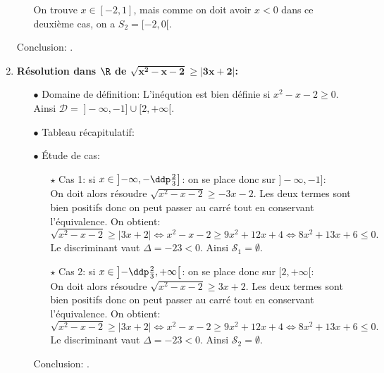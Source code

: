 \begin{correction}
\begin{enumerate}
\begin{itemize}
On trouve $x \in [-2,1]$, mais comme on doit avoir $x<0$ dans ce deuxi\`eme cas, on a $S_2=[-2,0[$.
\end{itemize}
Conclusion: .
\item \textbf{R\'esolution dans $\mathbf{\R}$ de $\mathbf{\sqrt{x^2-x-2}\geq |3x+2|}$:}\\
\begin{itemize}
\item[$\bullet$] Domaine de d\'efinition: L'in\'eqution est bien d\'efinie si $x^2-x-2\geq 0$. Ainsi $\mathcal{D}= \;\rbrack -\infty,-1\rbrack\cup\lbrack 2,+\infty\lbrack$.
\item[$\bullet$] Tableau r\'ecapitulatif:
\begin{center}
\end{center}
\item[$\bullet$] \'Etude de cas:
\begin{itemize}
\item[$\star$] Cas 1: si $x\in\left\rbrack -\infty,-\ddp\frac{2}{3}\right\rbrack$: on se place donc sur $\rbrack -\infty,-1\rbrack$:\\
\noindent On doit alors r\'esoudre $\sqrt{x^2-x-2}\geq -3x-2$. Les deux termes sont bien positifs donc on peut passer au carr\'e tout en conservant l'\'equivalence. On obtient:
$$\sqrt{x^2-x-2}\geq |3x+2| \Leftrightarrow x^2-x-2\geq 9x^2+12x+4 \Leftrightarrow 8x^2+13x+6\leq 0.$$
Le discriminant vaut $\Delta=-23<0$.
Ainsi $\mathcal{S}_1=\emptyset$.
\item[$\star$] Cas 2: si $x\in\left\rbrack -\ddp\frac{2}{3},+\infty\right\lbrack$: on se place donc sur $\lbrack 2,+\infty\lbrack$:\\
\noindent On doit alors r\'esoudre $\sqrt{x^2-x-2}\geq 3x+2$. Les deux termes sont bien positifs donc on peut passer au carr\'e tout en conservant l'\'equivalence. On obtient:
$$\sqrt{x^2-x-2}\geq |3x+2| \Leftrightarrow x^2-x-2\geq 9x^2+12x+4 \Leftrightarrow 8x^2+13x+6\leq 0.$$
Le discriminant vaut $\Delta=-23<0$.
Ainsi $\mathcal{S}_2=\emptyset$.
\end{itemize}
Conclusion: .
\end{itemize}

\end{enumerate}
\end{correction}
